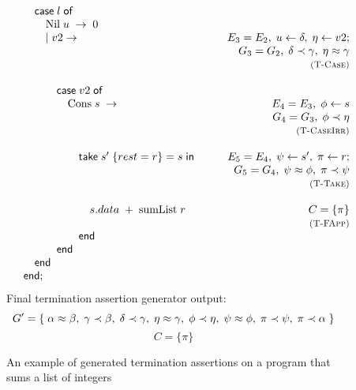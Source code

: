 \begin{figure}
\[\begin{array}{lr}
            \hspace{2em}    \textsf{case}\; l\; \textsf{of} \\
            \hspace{3em}        \text{Nil}\; u\; \rightarrow\; 0 \\
            \hspace{3em}    |\; v2 \rightarrow 
                & E_3 = E_2,\; u \leftarrow \delta,\; \eta \leftarrow v2; \\
                & G_3 = G_2,\; \delta \prec \gamma,\; \eta \approx \gamma \\
                & \textsc{\footnotesize (T-Case)}\\
                \\
            \hspace{4em}    \textsf{case}\; v2\; \textsf{of} \\
            \hspace{5em}    \text{Cons}\; s\; \rightarrow 
                & E_4 = E_3,\; \phi \leftarrow s \\
                & G_4 = G_3,\; \phi \prec \eta \\
                & \textsc{\footnotesize (T-CaseIrr)} \\
                \\
            \hspace{6em}    \textsf{take}\; s'\; \{ rest = r \} = s\; \textsf{in} \hspace{2em}
                & E_5 = E_4,\; \psi \leftarrow s',\; \pi \leftarrow r;  \\
                & G_5 = G_4,\; \psi \approx \phi,\; \pi \prec \psi  \\
                & \textsc{\footnotesize (T-Take)} \\
                \\
            \hspace{7em}        s.data\; +\; \text{sumList}\; r
                & C = \{\pi\}\\
                & \textsc{\footnotesize (T-FApp)}\\
            \hspace{6em}    \textsf{end} \\
            \hspace{4em}    \textsf{end} \\
            \hspace{2em}    \textsf{end} \\
            \hspace{1em}    \textsf{end};
        \end{array}
    \]
    Final termination assertion generator output:
    \[
        G' = \{\;
            \alpha \approx \beta,\;
            \gamma \prec \beta,\;
            \delta \prec \gamma,\;
            \eta \approx \gamma,\;
            \phi \prec \eta,\;
            \psi \approx \phi,\;
            \pi \prec \psi,\;
            \pi \prec \alpha\;
        \} \]
    \[
        C = \{\pi\}    
    \]

    
    \caption{An example of generated termination assertions on a program
             that sums a list of integers}
    \label{fig:exampletermination}
\end{figure}

